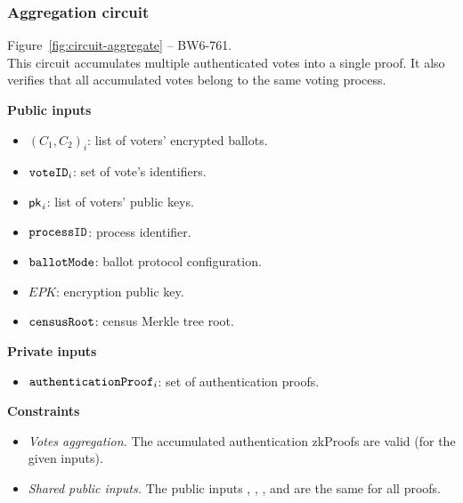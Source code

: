 \newpage
\subsubsection{Aggregation circuit}

Figure~\ref{fig:circuit-aggregate} -- BW6-761.\\

\noi This circuit accumulates multiple authenticated votes into a single proof. It also verifies that all accumulated votes belong to the same voting process.



\begin{spacing}{1.25}
	\vspace{0.3cm}
	\noi \textbf{Public inputs}
	\begin{itemize}
		\item \public $(C_1, C_2)_i$: list of voters' encrypted ballots.
		\item \public $\texttt{voteID}_i$: set of vote's identifiers.
		\item \public ${\sf{pk}^{}}_i$: list of voters' public keys.
		\item \public $\texttt{processID}$: process identifier.
		\item \public $\texttt{ballotMode}$: ballot protocol configuration.
		\item \public $EPK$: encryption public key.
		\item \public $\texttt{censusRoot}$: census Merkle tree root.
	\end{itemize}
	\textbf{Private inputs}
	\begin{itemize}								
		\item \private $\texttt{authenticationProof}_i$: set of authentication proofs.
	\end{itemize}
	\textbf{Constraints} \\ \vspace{-0.4cm}		
	\begin{itemize}
		\item \emph{Votes aggregation.} The accumulated authentication zkProofs are valid (for the given inputs).
		\item \emph{Shared public inputs.} The public inputs \processid, \ballotmode, \epk, and \censusroot are the same for all proofs.
	\end{itemize}
	\vspace{-0.3cm}
\end{spacing}


